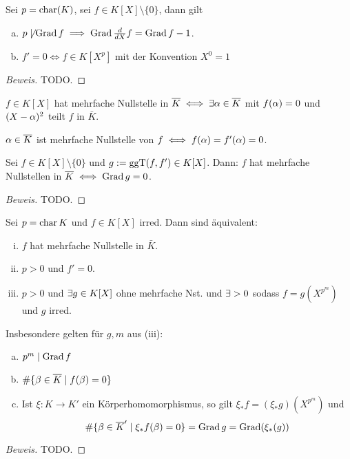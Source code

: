 \documentclass[a4paper]{report}
\begin{document}
\begin{lemm}Sei $p = \operatorname{char}(K)$, sei $f \in K[X] \setminus \{0\}$, dann gilt
  \begin{enumerate}[(a)]
    \item $p \not \mid  \operatorname{Grad} f \implies \operatorname{Grad} \frac d{dX} f = \operatorname{Grad} f - 1$.
    \item $f' = 0 \iff f \in K[X^{p}]$ mit der Konvention $X^{0} = 1$
  \end{enumerate}
\begin{proof}[Beweis]
TODO.
\end{proof}
\end{lemm}

\begin{defi}
$f \in K[X]$ hat mehrfache Nullstelle in $\overline K \iff \exists \alpha \in \overline K$ mit $f(\alpha) = 0$ und $(X - \alpha)^2$ teilt $f$ in $\bar K$.
\end{defi}
\begin{bem}[Übung]
$\alpha \in \overline K$ ist mehrfache Nullstelle von $f \iff f(\alpha) = f'(\alpha) = 0$.
\end{bem}
\begin{prop} Sei $f \in K[X] \setminus \{0\}$ und $g:= \operatorname{ggT}(f, f') \in K[X]$. Dann: $f$ hat mehrfache Nullstellen in $\overline K \iff \operatorname{Grad} g = 0$.
  \begin{proof}[Beweis]
TODO.
  \end{proof}
\end{prop}
\begin{kor}
  Sei $p = \operatorname{char} K$ und $f \in K[X]$ irred. Dann sind äquivalent:
  \begin{enumerate}[(i)]
    \item $f$ hat mehrfache Nullstelle in $\bar K$.
    \item $p > 0$ und $f' = 0$.
    \item $p > 0$ und $\exists g \in K[X]$ ohne mehrfache Nst. und $\exists  > 0$ sodass $f = g(X^{p^m})$ und $g$ irred.
  \end{enumerate}
  Insbesondere gelten für $g, m$ aus (iii):
  \begin{enumerate}[(a)]
    \item $p^{m} \mid \operatorname{Grad} f$
    \item $\#\{\beta \in \overline K \mid f(\beta) = 0\}$
    \item Ist $\xi : K \to K'$ ein Körperhomomorphismus, so gilt $\xi_{*}f = (\xi_{*}g)(X^{p^{m}})$ und
          \[\# \{\beta \in \overline K' \mid \xi_{*}f(\beta) = 0\} = \operatorname{Grad} g = \operatorname{Grad}(\xi_{*}(g))\]
  \end{enumerate}
\begin{proof}[Beweis]
TODO.
\end{proof}
\end{kor}
\end{document}
